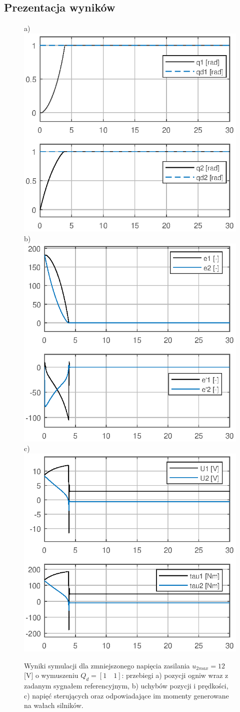 \documentclass[12pt, a4paper, polish]{article}
\begin{document}
	\subsection{Prezentacja wyników}
	\begin{figure}[h]
		\centering	
		a) \includegraphics[width=0.30\columnwidth]{SRManL4_ZADANIE1/figs/01Pozycje_U12} b)\includegraphics[width=0.30\columnwidth]{SRManL4_ZADANIE1/figs/01Uchyby_U12} c)\includegraphics[width=0.30\columnwidth]{SRManL4_ZADANIE1/figs/01Sygnaly_U12}\caption{
			Wyniki symulacji dla zmniejszonego napięcia zasilania $u_{2max}=12$ [V] o wymuszeniu $Q_d=[1\quad1]$: przebiegi a) pozycji ogniw wraz z zadanym sygnałem referencyjnym, b) uchybów pozycji i prędkości, c)  napięć sterujących oraz odpowiadające im momenty generowane na wałach silników.}\label{fig:hiperkula12v}
	\end{figure}
\end{document}
